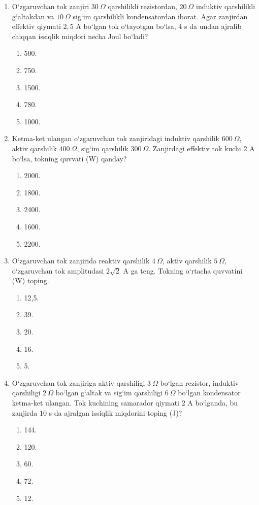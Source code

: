 \begin{enumerate}
\item O‘zgaruvchan tok zanjiri $30~\Omega$ qarshilikli rezistordan, $20~\Omega$ induktiv qarshilikli g‘altakdan va $10~\Omega$ sig‘im qarshilikli kondensatordan iborat. Agar zanjirdan effektiv qiymati $2,5$ A bo‘lgan tok o‘tayotgan bo‘lsa, $4$ s da undan ajralib chiqqan issiqlik miqdori necha Joul bo‘ladi?
\begin{enumerate}[label=\Alph*)]
\item 500.
\item 750.
\item 1500.
\item 780.
\item 1000.
\end{enumerate}

\item Ketma-ket ulangan o‘zgaruvchan tok zanjiridagi induktiv qarshilik $600~\Omega$, aktiv qarshilik $400~\Omega$, sig‘im qarshilik $300~\Omega$. Zanjirdagi effektiv tok kuchi $2$ A bo‘lsa, tokning quvvati (W) qanday?
\begin{enumerate}[label=\Alph*)]
\item 2000.
\item 1800.
\item 2400.
\item 1600.
\item 2200.
\end{enumerate}

\item O‘zgaruvchan tok zanjirida reaktiv qarshilik $4~\Omega$, aktiv qarshilik $5~\Omega$, o‘zgaruvchan tok amplitudasi $2\sqrt2$ A ga teng. Tokning o‘rtacha quvvatini (W) toping.
\begin{enumerate}[label=\Alph*)]
\item 12,5.
\item 39.
\item 20.
\item 16.
\item 5.
\end{enumerate}

\item O‘zgaruvchan tok zanjiriga aktiv qarshiligi $3~\Omega$ bo‘lgan rezistor, induktiv qarshiligi $2~\Omega$ bo‘lgan g‘altak va sig‘im qarshiligi $6~\Omega$ bo‘lgan kondensator ketma-ket ulangan. Tok kuchining samarador qiymati $2$ A bo‘lganda, bu zanjirda $10$ s da ajralgan issiqlik miqdorini toping (J)?
\begin{enumerate}[label=\Alph*)]
\item 144.
\item 120.
\item 60.
\item 72.
\item 12.
\end{enumerate}

\end{enumerate}


